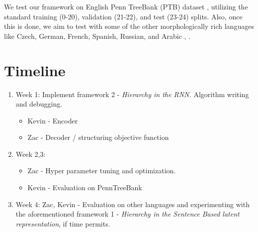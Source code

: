 \documentclass[journal, 12pt, draftcls, onecolumn]{IEEEtran}
\begin{document}
We test our framework on English Penn TreeBank (PTB) dataset \cite{C18}, utilizing the standard training (0-20), validation (21-22), and test (23-24) splits. Also, once this is done, we aim to test with some of the other morphologically rich languages like Czech, German, French, Spanish, Russian, and Arabic \cite{C19}, \cite{C20}. 

\section{Timeline} \label{timeline}
\begin{enumerate}
    \item Week 1: Implement framework 2 - \emph{Hierarchy in the RNN.} Algorithm writing and debugging. 
    \begin{itemize}
        \item Kevin - Encoder 
        \item Zac - Decoder / structuring objective function
    \end{itemize}
    \item Week 2,3: 
    \begin{itemize}
        \item Zac - Hyper parameter tuning and optimization.
        \item Kevin - Evaluation on PennTreeBank 
    \end{itemize}
    \item Week 4: Zac, Kevin - Evaluation on other languages and experimenting with the aforementioned framework 1 - \emph{Hierarchy in the Sentence Based latent representation}, if time permits.  
\end{enumerate}
\end{document}
